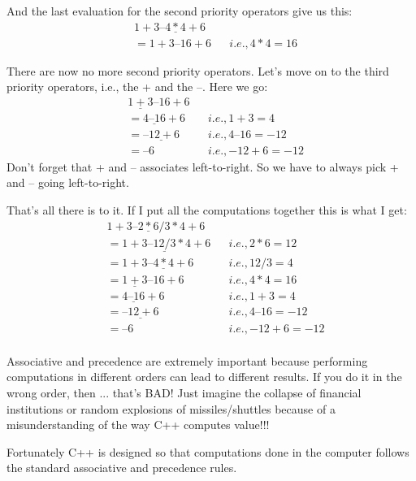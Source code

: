 And the last evaluation for the second priority operators give us this:
\begin{align*}
&1+3–\underline{4*4}+6\\
&= 1 + 3 – 16 + 6 & &i.e., 4 * 4 = 16
  \end{align*}
    
There are now no more second priority operators. Let's move on to the
third priority operators, i.e., the + and the –. Here we go:
\begin{align*}
  &\underline{1 + 3} – 16 + 6 \\
  &= \underline{4 – 16} + 6 & &i.e., 1 + 3 = 4 \\
  &= \underline{–12 + 6} & &i.e., 4 – 16 = -12 \\
  &= –6 & &i.e., -12 + 6 = -12
\end{align*}
Don't forget that + and – associates left-to-right. So we have to always
pick + and – going left-to-right.

That's all there is to it. If I put all the computations together this is what I
get:
\begin{align*}
  &1+3–\underline{2*6}/ 3*4+6 \\
  &= 1 + 3 – \underline{12 / 3} * 4 + 6 & &i.e., 2 * 6 = 12\\
  &=1+3–\underline{4*4}+6 & &i.e., 12/ 3 = 4\\
  &= \underline{1 + 3} – 16 + 6 & &i.e., 4 * 4 = 16\\
  &= \underline{4 – 16} + 6 & &i.e., 1 + 3 = 4\\
  &= \underline{–12 + 6} & &i.e., 4 – 16 = -12\\
  &= –6 & &i.e., -12 + 6 = -12\\
\end{align*}

%

Associative and precedence are extremely important because performing
computations in different orders can lead to different results. If you do it
in the wrong order, then ... that's BAD! Just imagine the collapse of
financial institutions or random explosions of missiles/shuttles because of
a misunderstanding of the way C++ computes value!!!


Fortunately C++ is designed so that computations done in the computer
follows the standard associative and precedence rules.

%
%
%



